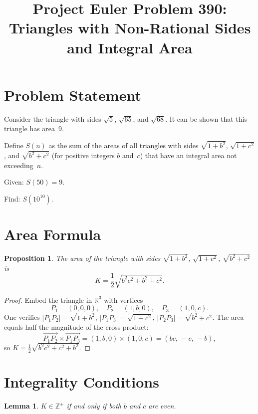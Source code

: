 \documentclass[11pt]{article}
\title{Project Euler Problem 390:\\Triangles with Non-Rational Sides and Integral Area}
\author{}
\date{}
\newtheorem{lemma}[theorem]{Lemma}
\newtheorem{proposition}[theorem]{Proposition}
\begin{document}
\maketitle

\section{Problem Statement}

Consider the triangle with sides $\sqrt{5}$, $\sqrt{65}$, and $\sqrt{68}$.
It can be shown that this triangle has area~9.

Define $S(n)$ as the sum of the areas of all triangles with sides
$\sqrt{1+b^2}$, $\sqrt{1+c^2}$, and $\sqrt{b^2+c^2}$ (for positive
integers $b$ and~$c$) that have an integral area not exceeding~$n$.

Given: $S(50) = 9$.

Find: $S(10^{10})$.

\section{Area Formula}

\begin{proposition}
The area of the triangle with sides $\sqrt{1+b^2}$, $\sqrt{1+c^2}$,
$\sqrt{b^2+c^2}$ is
\[
  K = \frac{1}{2}\sqrt{b^2 c^2 + b^2 + c^2}.
\]
\end{proposition}

\begin{proof}
Embed the triangle in $\mathbb{R}^3$ with vertices
\[
  P_1 = (0,0,0), \quad P_2 = (1,b,0), \quad P_3 = (1,0,c).
\]
One verifies $|P_1P_2| = \sqrt{1+b^2}$, $|P_1P_3| = \sqrt{1+c^2}$,
$|P_2P_3| = \sqrt{b^2+c^2}$. The area equals half the magnitude of the
cross product:
\[
  \overrightarrow{P_1P_2} \times \overrightarrow{P_1P_3}
  = (1,b,0) \times (1,0,c) = (bc,\, -c,\, -b),
\]
so $K = \tfrac{1}{2}\sqrt{b^2c^2 + c^2 + b^2}$.
\end{proof}

\section{Integrality Conditions}

\begin{lemma}
$K \in \mathbb{Z}^+$ if and only if both $b$ and $c$ are even.
\end{lemma}
\end{document}
